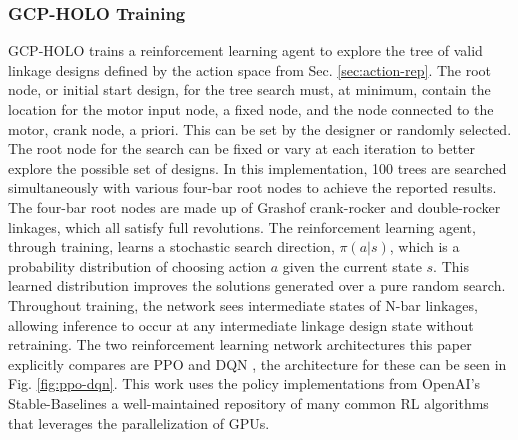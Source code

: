 \subsubsection{GCP-HOLO Training}\label{sec:training}
GCP-HOLO trains a reinforcement learning agent to explore the tree of valid linkage designs defined by the action space from Sec. \ref{sec:action-rep}. The root node, or initial start design, for the tree search must, at minimum, contain the location for the motor input node, a fixed node, and the node connected to the motor, crank node, a priori. This can be set by the designer or randomly selected. The root node for the search can be fixed or vary at each iteration to better explore the possible set of designs. In this implementation, 100 trees are searched simultaneously with various four-bar root nodes to achieve the reported results. The four-bar root nodes are made up of Grashof crank-rocker and double-rocker linkages, which all satisfy full revolutions. The reinforcement learning agent, through training, learns a stochastic search direction, $\pi(a|s)$, which is a probability distribution of choosing action $a$ given the current state $s$. This learned distribution improves the solutions generated over a pure random search. Throughout training, the network sees intermediate states of N-bar linkages, allowing inference to occur at any intermediate linkage design state without retraining. The two reinforcement learning network architectures this paper explicitly compares are PPO \cite{schulman_proximal_2017} and DQN \cite{mnih_human-level_2015}, the architecture for these can be seen in Fig. \ref{fig:ppo-dqn}. This work uses the policy implementations from OpenAI’s Stable-Baselines \cite{raffin_stable-baselines3_2021} a well-maintained repository of many common RL algorithms that leverages the parallelization of GPUs.

